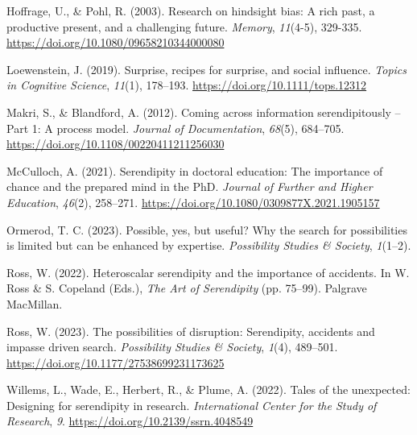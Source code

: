 \documentclass[authordate, commentary]{jote-new-article}
\begin{document}
	Hoffrage, U., \& Pohl, R. (2003). Research on hindsight bias: A rich past, a productive present, and a challenging future. \emph{Memory}, \emph{11}(4-5), 329-335. \href{https://doi.org/10.1080/09658210344000080}{https://doi.org/10.1080/09658210344000080}



	Loewenstein, J. (2019). Surprise, recipes for surprise, and social influence. \emph{Topics in Cognitive Science}, \emph{11}(1), 178--193. \href{https://doi.org/10.1111/tops.12312}{https://doi.org/10.1111/tops.12312}



	Makri, S., \& Blandford, A. (2012). Coming across information serendipitously -- Part 1: A process model. \emph{Journal of Documentation}, \emph{68}(5), 684--705. \href{https://doi.org/10.1108/00220411211256030}{https://doi.org/10.1108/00220411211256030}



	McCulloch, A. (2021). Serendipity in doctoral education: The importance of chance and the prepared mind in the PhD. \emph{Journal of Further and Higher Education}, \emph{46}(2), 258--271. \href{https://doi.org/10.1080/0309877X.2021.1905157}{https://doi.org/10.1080/0309877X.2021.1905157}



	Ormerod, T. C. (2023). Possible, yes, but useful? Why the search for possibilities is limited but can be enhanced by expertise. \emph{Possibility Studies \& Society}, \emph{1}(1--2).



	Ross, W. (2022). Heteroscalar serendipity and the importance of accidents. In W. Ross \& S. Copeland (Eds.), \emph{The Art of Serendipity} (pp. 75--99). Palgrave MacMillan.



	Ross, W. (2023). The possibilities of disruption: Serendipity, accidents and impasse driven search. \emph{Possibility Studies \& Society}, \emph{1}(4), 489--501. \href{https://doi.org/10.1177/27538699231173625}{https://doi.org/10.1177/27538699231173625}



	Willems, L., Wade, E., Herbert, R., \& Plume, A. (2022). Tales of the unexpected: Designing for serendipity in research. \emph{International Center for the Study of Research}, \emph{9}. \href{https://doi.org/10.2139/ssrn.4048549}{https://doi.org/10.2139/ssrn.4048549}
\end{document}

